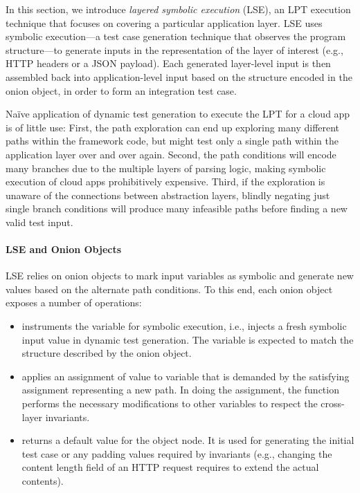 In this section, we introduce \emph{layered symbolic execution} (LSE), an LPT execution technique that focuses on covering a particular application layer.  LSE uses symbolic execution---a test case generation technique that observes the program structure---to generate inputs in the representation of the layer of interest (e.g., HTTP headers or a JSON payload).  Each generated layer-level input is then assembled back into application-level input based on the structure encoded in the onion object, in order to form an integration test case.

Na\"ive application of dynamic test generation to execute the LPT for a cloud app is of little use: First, the path exploration can end up exploring many different paths within the framework code, but might test only a single path within the application layer over and over again. Second, the path conditions will encode many branches due to the multiple layers of parsing logic, making symbolic execution of cloud apps prohibitively expensive. Third, if the exploration is unaware of the connections between abstraction layers, blindly negating just single branch conditions will produce many infeasible paths before finding a new valid test input.

\paragraph{LSE and Onion Objects}

LSE relies on onion objects to mark input variables as symbolic and generate new values based on the alternate path conditions.  To this end, each onion object exposes a number of operations:

\begin{itemize}
\item {} instruments the variable 
  for symbolic execution, i.e., injects a fresh symbolic input value
  in dynamic test generation.  The variable is expected to match the
  structure described by the onion object.
%
\item {} applies an assignment of value  to variable  that is demanded by the satisfying assignment representing a new path. In doing the assignment, the function performs the necessary modifications to other variables to respect the cross-layer invariants.
%
\item {} returns a default value for the object node. It is used for generating the initial test case or any padding values required by invariants (e.g., changing the content length field of an HTTP request requires to extend the actual contents).
\end{itemize}

